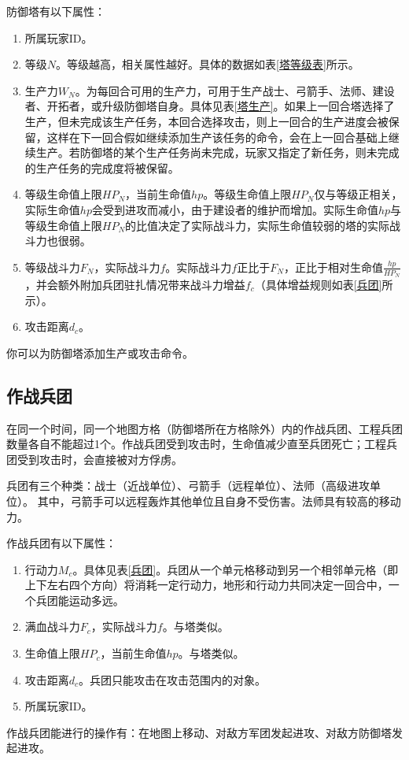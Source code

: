 \documentclass[a4paper,4pt]{article}
\begin{document}
防御塔有以下属性：
\begin{enumerate}[fullwidth, itemindent=2em, label=(\arabic*)]
  \item 所属玩家ID。
  \item 等级$N$。等级越高，相关属性越好。具体的数据如表\ref{塔等级表}所示。
  \item 生产力$W_N$。为每回合可用的生产力，可用于生产战士、弓箭手、法师、建设者、开拓者，或升级防御塔自身。具体见表\ref{塔生产}。如果上一回合塔选择了生产，但未完成该生产任务，本回合选择攻击，则上一回合的生产进度会被保留，这样在下一回合假如继续添加生产该任务的命令，会在上一回合基础上继续生产。若防御塔的某个生产任务尚未完成，玩家又指定了新任务，则未完成的生产任务的完成度将被保留。
  \item 等级生命值上限$HP_N$，当前生命值$hp$。等级生命值上限$HP_N$仅与等级正相关，实际生命值$hp$会受到进攻而减小，由于建设者的维护而增加。实际生命值$hp$与等级生命值上限$HP_N$的比值决定了实际战斗力，实际生命值较弱的塔的实际战斗力也很弱。
  \item 等级战斗力$F_N$，实际战斗力$f$。实际战斗力$f$正比于$F_N$，正比于相对生命值$\frac{hp}{HP_N}$，并会额外附加兵团驻扎情况带来战斗力增益$f_c$（具体增益规则如表\ref{兵团}所示）。
  \item 攻击距离$d_c$。
\end{enumerate}
\par

你可以为防御塔添加生产或攻击命令。


\subsection{作战兵团}
在同一个时间，同一个地图方格（防御塔所在方格除外）内的作战兵团、工程兵团数量各自不能超过1个。作战兵团受到攻击时，生命值减少直至兵团死亡；工程兵团受到攻击时，会直接被对方俘虏。\par
兵团有三个种类：战士（近战单位）、弓箭手（远程单位）、法师（高级进攻单位）。
其中，弓箭手可以远程轰炸其他单位且自身不受伤害。法师具有较高的移动力。\par
作战兵团有以下属性：
\begin{enumerate}[fullwidth, itemindent=2em, label=(\arabic*)]
  \item 行动力$M_c$。具体见表\ref{兵团}。兵团从一个单元格移动到另一个相邻单元格（即上下左右四个方向）将消耗一定行动力，地形和行动力共同决定一回合中，一个兵团能运动多远。
  \item 满血战斗力$F_c$，实际战斗力$f$。与塔类似。
  \item 生命值上限$HP_c$，当前生命值$hp$。与塔类似。
  \item 攻击距离$d_c$。兵团只能攻击在攻击范围内的对象。
  \item 所属玩家ID。
\end{enumerate}
\par
作战兵团能进行的操作有：在地图上移动、对敌方军团发起进攻、对敌方防御塔发起进攻。
\end{document}
